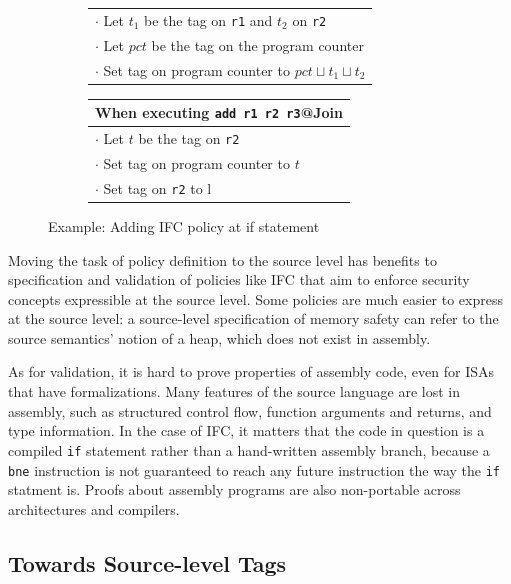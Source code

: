 \begin{figure}
\begin{subfigure}{\textwidth}
\begin{tabular}{|l|}
      \(\cdot\) Let \(t_1\) be the tag on {\tt r1} and \(t_2\) on {\tt r2} \\
       \rowcolor{blue!30}
      \(\cdot\) Let \(pct\) be the tag on the program counter \\
      \rowcolor{blue!30}
      \(\cdot\) Set tag on program counter to \(pct \sqcup t_1 \sqcup t_2\) \\
      \hline
    \end{tabular}
    \begin{tabular}{|l|}
      \hline
      When executing {\tt add r1 r2 r3}@{\sc Join} \\
      \hline
      \rowcolor{blue!30}
      \(\cdot\) Let \(t\) be the tag on {\tt r2} \\
      \rowcolor{blue!30}
      \(\cdot\) Set tag on program counter to \(t\) \\
      \rowcolor{red!20}
      \(\cdot\) Set tag on {\tt r2} to {\sc l} \\
      \hline
    \end{tabular}
 \end{subfigure}

  \caption{Example: Adding IFC policy at if statement}
  \label{ch1:ex:if}
\end{figure}

Moving the task of policy definition to the source level has benefits to specification and
validation of policies like IFC that aim to enforce security concepts expressible at the
source level. Some policies are much easier to express at the source level: a source-level
specification of memory safety can refer to the source semantics' notion of a heap, which
does not exist in assembly.

As for validation, it is hard to prove properties of assembly code, even for ISAs that
have formalizations. Many features of the source language are lost in assembly, such as 
structured control flow, function arguments and returns, and type information.
In the case of IFC, it matters that the code in question is a compiled {\tt if} statement
rather than a hand-written assembly branch, because a {\tt bne} instruction is not guaranteed to
reach any future instruction the way the {\tt if} statment is.
Proofs about assembly programs are also non-portable across architectures and compilers.

\subsection{Towards Source-level Tags}


